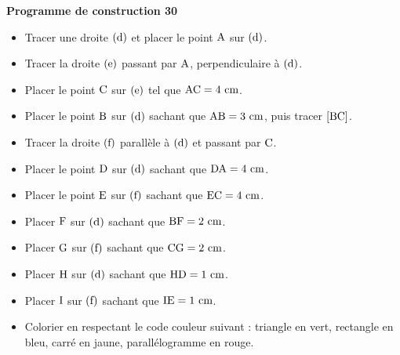 \documentclass[exercice,a4]{thedocument}%
\begin{document}
%
\noindent\textbf{Programme de construction 30}\par\smallskip\noindent
\begin{itemize}
    \item Tracer une droite $(\text{d})$ et placer le point
    $\text{A}$ sur $(\text{d})$.
    \item Tracer la droite $(\text{e})$ passant par
    $\text{A}$, perpendiculaire à $(\text{d})$.
    \item Placer le point $\text{C}$ sur $(\text{e})$ tel que
    $\text{AC}=4\text{ cm}$.
    \item Placer le point $\text{B}$ sur $(\text{d})$ sachant
    que $\text{AB}=3\text{ cm}$, puis tracer $[\text{BC}]$.
    \item Tracer la droite $(\text{f})$ parallèle à
    $(\text{d})$ et passant par $\text{C}$.
    \item Placer le point $\text{D}$ sur $(\text{d})$ sachant
    que $\text{DA}=4\text{ cm}$.
    \item Placer le point $\text{E}$ sur $(\text{f})$ sachant
    que $\text{EC}=4\text{ cm}$.
    \item Placer $\text{F}$ sur $(\text{d})$ sachant que
    $\text{BF}=2\text{ cm}$.
    \item Placer $\text{G}$ sur $(\text{f})$ sachant que
    $\text{CG}=2\text{ cm}$.
    \item Placer $\text{H}$ sur $(\text{d})$ sachant que
    $\text{HD}=1\text{ cm}$.
    \item Placer $\text{I}$ sur $(\text{f})$ sachant que
    $\text{IE}=1\text{ cm}$.
    \item Colorier en respectant le code couleur suivant : triangle en
    vert, rectangle en bleu, carré en jaune, parallélogramme en rouge.
\end{itemize}
\end{document}
